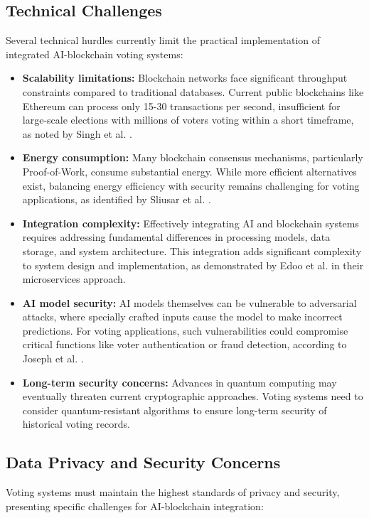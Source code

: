 \documentclass[conference]{IEEEtran}
\begin{document}
\subsection{Technical Challenges}
Several technical hurdles currently limit the practical implementation of integrated AI-blockchain voting systems:

\begin{itemize}
    \item \textbf{Scalability limitations:} Blockchain networks face significant throughput constraints compared to traditional databases. Current public blockchains like Ethereum can process only 15-30 transactions per second, insufficient for large-scale elections with millions of voters voting within a short timeframe, as noted by Singh et al. \cite{b7}.
    
    \item \textbf{Energy consumption:} Many blockchain consensus mechanisms, particularly Proof-of-Work, consume substantial energy. While more efficient alternatives exist, balancing energy efficiency with security remains challenging for voting applications, as identified by Sliusar et al. \cite{b6}.
    
    \item \textbf{Integration complexity:} Effectively integrating AI and blockchain systems requires addressing fundamental differences in processing models, data storage, and system architecture. This integration adds significant complexity to system design and implementation, as demonstrated by Edoo et al. \cite{b9} in their microservices approach.
    
    \item \textbf{AI model security:} AI models themselves can be vulnerable to adversarial attacks, where specially crafted inputs cause the model to make incorrect predictions. For voting applications, such vulnerabilities could compromise critical functions like voter authentication or fraud detection, according to Joseph et al. \cite{b8}.
    
    \item \textbf{Long-term security concerns:} Advances in quantum computing may eventually threaten current cryptographic approaches. Voting systems need to consider quantum-resistant algorithms to ensure long-term security of historical voting records.
\end{itemize}

\subsection{Data Privacy and Security Concerns}
Voting systems must maintain the highest standards of privacy and security, presenting specific challenges for AI-blockchain integration:
\end{document}
